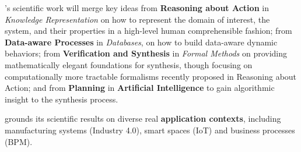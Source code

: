 \project's scientific work will merge key ideas 
from \textbf{Reasoning about Action} in \emph{Knowledge Representation} on how to represent the domain of interest, the
system, and their properties in a high-level human
comprehensible fashion;
from \textbf{Data-aware Processes} in \emph{Databases}, on how to build data-aware dynamic behaviors;
from \textbf{Verification and Synthesis} in \emph{Formal Methods} on providing
mathematically elegant foundations for synthesis, though focusing on
computationally more tractable formalisms recently proposed in
Reasoning about Action;
and from \textbf{Planning} in \textbf{Artificial Intelligence} to gain
algorithmic insight to the synthesis process.

\project grounds its scientific results on diverse real
\textbf{application contexts}, including manufacturing systems
(Industry 4.0), smart spaces (IoT) and business processes
(BPM).%

 



